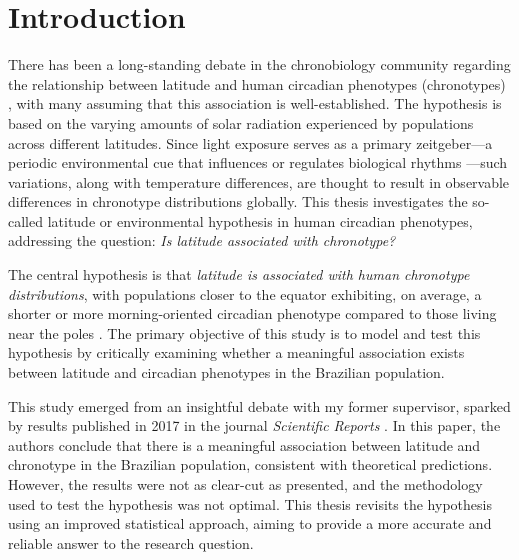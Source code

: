 \documentclass[
12pt,
openright,
oneside,
a4paper,
chapter=TITLE,
section=TITLE,
french,
spanish,
brazil,
english
]{abntex2}
\renewcommand{\contentsname}{Contents}
\renewcommand{\contentsname}{Sumário}
\renewcommand{\contentsname}{Sumario}
\renewcommand{\contentsname}{Sommaire}
\renewcommand{\textual}{
  \pagestyle{abntheadings}
  \aliaspagestyle{chapter}{abntheadings}
}
\renewcommand*\contentsname{Table of Contents}
\newcommand\contentsname{Table of Contents}
\begin{document}

\pdfbookmark[0]{\contentsname}{toc}
\tableofcontents*
\cleardoublepage




\textual
{}

\chapter{Introduction}\label{sec-introduction}

There has been a long-standing debate in the chronobiology community
regarding the relationship between latitude and human circadian
phenotypes (chronotypes)
\autocites[e.g.,][]{bohlen1973,randler2008,leocadio-miguel2017,wang2023},
with many assuming that this association is well-established. The
hypothesis is based on the varying amounts of solar radiation
experienced by populations across different latitudes. Since light
exposure serves as a primary zeitgeber---a periodic environmental cue
that influences or regulates biological rhythms
\autocite{aschoff1960,pittendrigh1960}---such variations, along with
temperature differences, are thought to result in observable differences
in chronotype distributions globally. This thesis investigates the
so-called latitude or environmental hypothesis in human circadian
phenotypes, addressing the question: \emph{Is latitude associated with
chronotype?}

The central hypothesis is that \emph{latitude is associated with human
chronotype distributions}, with populations closer to the equator
exhibiting, on average, a shorter or more morning-oriented circadian
phenotype compared to those living near the poles
\autocite{bohlen1973,roenneberg2003b,leocadio-miguel2017}. The primary
objective of this study is to model and test this hypothesis by
critically examining whether a meaningful association exists between
latitude and circadian phenotypes in the Brazilian population.

This study emerged from an insightful debate with my former supervisor,
sparked by results published in 2017 in the journal \emph{Scientific
Reports} \autocite{leocadio-miguel2017}. In this paper, the authors
conclude that there is a meaningful association between latitude and
chronotype in the Brazilian population, consistent with theoretical
predictions. However, the results were not as clear-cut as presented,
and the methodology used to test the hypothesis was not optimal. This
thesis revisits the hypothesis using an improved statistical approach,
aiming to provide a more accurate and reliable answer to the research
question.
\end{document}
